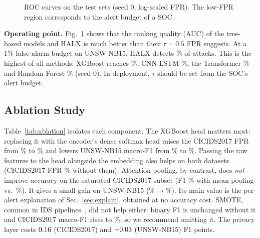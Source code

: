 \begin{figure}[t]
\centering

\caption{ROC curves on the test sets (seed 0, log-scaled FPR). The low-FPR
region corresponds to the alert budget of a SOC.}
\label{fig:roc}
\end{figure}

\textbf{Operating point.} Fig.~\ref{fig:roc} shows that the ranking quality
(AUC) of the tree-based models and HALX is much better than their
$\tau=0.5$ FPR suggests. At a 1\% false-alarm budget on UNSW-NB15, HALX
detects \unswHALXtprOne\% of attacks. This is the highest of all
methods: XGBoost reaches \unswXGBoosttprOne\%, CNN-LSTM
\unswCNNLSTMtprOne\%, the Transformer \unswTransformertprOne\% and Random
Forest \unswRFtprOne\% (seed 0). In deployment, $\tau$ should be set
from the SOC's alert budget.

\subsection{Ablation Study}
\begin{table}[t]
\caption{Ablation of HALX components (test F1, FPR and macro-F1, \%).
CICIDS2017: 3 seeds; UNSW-NB15: \ABLunswSeeds{}.}
\label{tab:ablation}
\centering
\scriptsize
\setlength{\tabcolsep}{2.6pt}

\end{table}
Table~\ref{tab:ablation} isolates each component. The XGBoost head
matters most: replacing it with the encoder's dense softmax head raises the
CICIDS2017 FPR from \cicablfullfpr\% to \cicablnoxgboostfpr\% and lowers
UNSW-NB15 macro-F1 from \unswablfullmfOne\% to \unswablnoxgboostmfOne\%.
Passing the raw features to the head alongside the embedding also helps on
both datasets (CICIDS2017 FPR \cicablnorawfeaturesfpr\% without them).
Attention pooling, by contrast, does \emph{not} improve accuracy on the
saturated CICIDS2017 subset (F1 \cicablnoattentionfOne\% with mean pooling
vs.\ \cicablfullfOne\%). It gives a small gain on UNSW-NB15
(\unswablnoattentionfOne\%$\to$\unswablfullfOne\%). Its main value is the
per-alert explanation of Sec.~\ref{sec:explain}, obtained at no accuracy
cost. SMOTE, common in IDS pipelines~\cite{ullah2023idsint}, did not help
either: binary F1 is unchanged without it and CICIDS2017 macro-F1 rises to
\cicablnosmotemfOne\%, so we recommend omitting it. The privacy layer costs
$0.16$ (CICIDS2017) and $-0.03$ (UNSW-NB15) F1 points.

